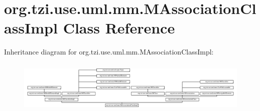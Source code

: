 \hypertarget{classorg_1_1tzi_1_1use_1_1uml_1_1mm_1_1_m_association_class_impl}{\section{org.\-tzi.\-use.\-uml.\-mm.\-M\-Association\-Class\-Impl Class Reference}
\label{classorg_1_1tzi_1_1use_1_1uml_1_1mm_1_1_m_association_class_impl}
}
Inheritance diagram for org.\-tzi.\-use.\-uml.\-mm.\-M\-Association\-Class\-Impl\-:\begin{figure}[H]
\begin{center}
\leavevmode
\includegraphics[height=2.542153cm]{classorg_1_1tzi_1_1use_1_1uml_1_1mm_1_1_m_association_class_impl}
\end{center}
\end{figure}

